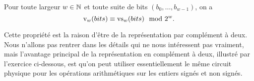 \documentclass{magnolia}
\begin{document}
\begin{proposition}
  Pour toute largeur $w\in\mathbb{N}$ et toute suite de bits $(b_0, \ldots, b_{w-1})$, on a
  \begin{displaymath}
    {\rm v}_{w}(bits) \equiv {\rm vs}_{w}(bits) \mod{2^{w}}.
  \end{displaymath}
\end{proposition}

\begin{remarques}
  \remarque
  Cette propriété est la raison d'être de la représentation par complément
  à deux.
  \remarque
  Nous n'allons pas rentrer dans les détails qui ne nous intéressent pas
  vraiment, mais l'avantage principal de la représentation en complément à
  deux, illustré par l'exercice ci-dessous, est qu'on peut utiliser
  essentiellement le même circuit physique pour les opérations arithmétiques
  sur les entiers signés et non signés.
\end{remarques}
\vspace{2ex}
\end{document}
